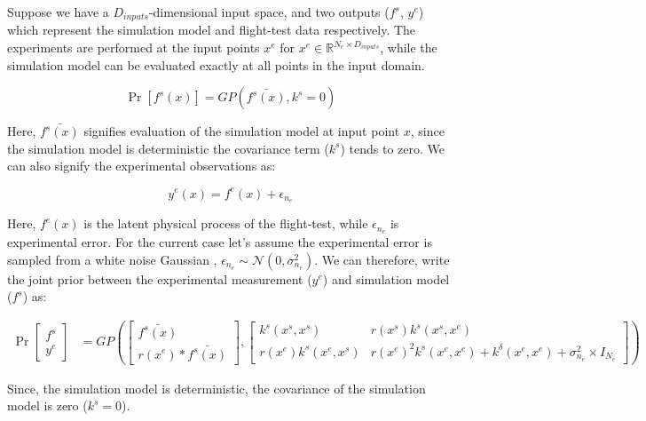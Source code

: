 Suppose we have a \(D_{inputs}\)-dimensional input space, and two outputs ($f^{s}$, $y^{e}$) which represent the simulation model and flight-test data respectively. The experiments are performed at the input points $x^{e}$ for $x^e \in \mathbb{R}^{N_{e} \times D_{inputs}}$, while the simulation model can be evaluated exactly at all points in the input domain.

\begin{equation}
    \Pr[f^{s}(x)] = GP(\bar{f^{s}(x)}, k^{s} = 0)
\end{equation}

Here, $\bar{f^{s}(x)}$ signifies evaluation of the simulation model at input point $x$, since the simulation model is deterministic the covariance term ($k^s$) tends to zero. We can also signify the experimental observations as:

\begin{equation}
    y^{e}(x) = f^{e}(x) + \epsilon_{n_{e}} 
\end{equation}

Here, $f^{e}(x)$ is the latent physical process of the flight-test, while $\epsilon_{n_{e}}$ is experimental error. For the current case let's assume the experimental error is sampled from a white noise Gaussian , $\epsilon_{n_{e}} \sim \mathcal{N}(0, \sigma_{n_{e}}^2)$. We can therefore, write the joint prior between the experimental measurement ($y^{e}$) and simulation model ($f^{s}$) as:

\begin{equation}
\begin{aligned}
     \Pr \begin{bmatrix}
f^{s}\\ 
y^{e}
\end{bmatrix}  & = GP\left ( \begin{bmatrix}
\bar{f^{s}(x)}\\ 
r(x^{e})*\bar{f^{s}(x)}
\end{bmatrix}, \begin{bmatrix} k^{s}(x^{s}, x^{s}) & r(x^{s})k^{s}(x^{s}, x^{e})   \\
           r(x^{e})k^{s}(x^{e}, x^{s}) & r(x^{e})^2k^{s}(x^{e}, x^{e}) + k^{\delta}(x^{e}, x^{e}) + \sigma_{n_{e}}^2 \times I_{N_{e}}\end{bmatrix}   \right )
           \end{aligned}
\end{equation}

Since, the simulation model is deterministic, the covariance of the simulation model is zero ($k^s = 0$).

